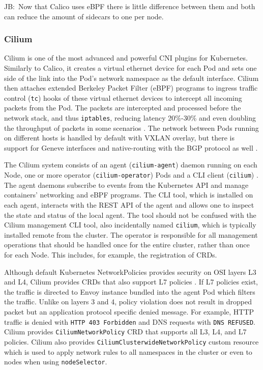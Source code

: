\documentclass[english, 12pt, a4paper, sci, utf8, a-2b, online]{aaltothesis}
\newcommand{\mycomment}[3]{\textcolor{#1}{#2:~#3}}
\newcommand{\jb}[1]{\noindent\mycomment{aaltoRed}{JB}{#1}}
\begin{document}
\jb{Now that Calico uses eBPF there is little difference between them and both can reduce the amount of sidecars to one per node.}

\subsubsection{Cilium}

Cilium \cite{cilium} is one of the most advanced and powerful CNI plugins for Kubernetes. Similarly to Calico, it creates a virtual ethernet device for each Pod and sets one side of the link into the Pod's network namespace \cite{cilium-tkng} as the default interface. Cilium then attaches extended Berkeley Packet Filter (eBPF) programs to ingress traffic control (\texttt{tc}) hooks of these virtual ethernet devices to intercept all incoming packets from the Pod. The packets are intercepted and processed before the network stack, and thus \texttt{iptables}, reducing latency 20\%-30\% and even doubling the throughput of packets in some scenarios \cite{budigiri2021network}. The network between Pods running on different hosts is handled by default with VXLAN overlay, but there is support for Geneve interfaces and native-routing with the BGP protocol as well \cite{cilium}.

The Cilium system consists of an agent (\texttt{cilium-agent}) daemon running on each Node, one or more operator (\texttt{cilium-operator}) Pods and a CLI client (\texttt{cilium}) \cite{cilium-components}. The agent daemons subscribe to events from the Kubernetes API and manage containers' networking and eBPF programs. The CLI tool, which is installed on each agent, interacts with the REST API of the agent and allows one to inspect the state and status of the local agent. The tool should not be confused with the Cilium management CLI tool, also incidentally named \texttt{cilium}, which is typically installed remote from the cluster. The operator is responsible for all management operations that should be handled once for the entire cluster, rather than once for each Node. This includes, for example, the registration of CRDs.

Although default Kubernetes NetworkPolicies provides security on OSI layers L3 and L4, Cilium provides CRDs that also support L7 policies \cite{cilium-policy-language}. If L7 policies exist, the traffic is directed to Envoy instance bundled into the agent Pod which filters the traffic. Unlike on layers 3 and 4, policy violation does not result in dropped packet but an application protocol specific denied message. For example, HTTP traffic is denied with \texttt{HTTP 403 Forbidden} and DNS requests with \texttt{DNS REFUSED}. Cilium provides \texttt{CiliumNetworkPolicy} CRD that supports all L3, L4, and L7 policies. Cilium also provides \texttt{CiliumClusterwideNetworkPolicy} custom resource which is used to apply network rules to all namespaces in the cluster or even to nodes when using \texttt{nodeSelector}.
\end{document}
